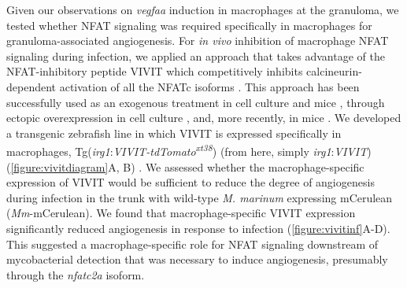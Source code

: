 Given our observations on \textit{vegfaa} induction in macrophages at the granuloma, we tested whether NFAT signaling was required specifically in macrophages for granuloma-associated angiogenesis. For \textit{in vivo} inhibition of macrophage NFAT signaling during infection, we applied an approach that takes advantage of the NFAT-inhibitory peptide VIVIT which competitively inhibits calcineurin-dependent activation of all the NFATc isoforms \citep{Aramburu1999}. This approach has been successfully used as an exogenous treatment in cell culture \citep{Deerhake2021} and mice \citep{Noguchi2004, Elloumi2012, Rojanathammanee2015}, through ectopic overexpression in cell culture \citep{McCullagh2004},  and, more recently, in mice \citep{Poli2022, Peuker2022}. We developed a transgenic zebrafish line in which VIVIT is expressed specifically in macrophages, Tg(\textit{irg1}:\textit{VIVIT-tdTomato\textsuperscript{xt38}}) (from here, simply \textit{irg1}:\textit{VIVIT}) (\autoref{figure:vivitdiagram}A, B) \citep{Sanderson2015}. We assessed whether the macrophage-specific expression of VIVIT would be sufficient to reduce the degree of angiogenesis during infection in the trunk with wild-type \textit{M. marinum} expressing mCerulean (\textit{Mm}-mCerulean). We found that macrophage-specific VIVIT expression significantly reduced angiogenesis in response to infection (\autoref{figure:vivitinf}A-D). This suggested a macrophage-specific role for NFAT signaling downstream of mycobacterial detection that was necessary to induce angiogenesis, presumably through the \textit{nfatc2a} isoform.

